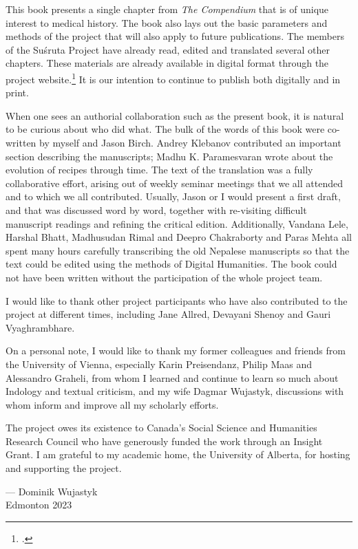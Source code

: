 This book presents a single chapter from \emph{The Compendium} that is of
unique interest to medical history.  The book also lays out the basic
parameters and methods of the project that will also apply to future
publications. The members of the Suśruta Project have already read, edited and
translated several other chapters.  These materials are already available in
digital format through the project website.\footcite{wuja-2021b} It is our
intention to continue to publish both digitally and in print.

When one sees an authorial collaboration such as the present book, it is natural to be 
curious about who did what.  The bulk of the words of this book were co-written by 
myself and Jason Birch.  Andrey Klebanov contributed an important section describing 
the manuscripts; Madhu K. Paramesvaran wrote about the evolution of recipes 
through time. The text of the translation was a fully collaborative effort, arising out of 
weekly seminar meetings that we all attended and to which we all contributed. 
Usually, Jason or I would present a first draft, and that was discussed word by word, 
together with re-visiting difficult manuscript readings and refining the critical edition. 
Additionally, Vandana Lele, Harshal Bhatt, Madhusudan Rimal and Deepro 
Chakraborty and Paras Mehta all spent many hours carefully transcribing the old 
Nepalese manuscripts so that the text could be edited using the methods of Digital 
Humanities.  The book could not have been written without the participation of the 
whole project team.


I would like to thank other project participants who have also contributed to
the project at different times, including Jane Allred, Devayani Shenoy and
Gauri Vyaghrambhare.  

On a personal note, I would like to thank my former colleagues and friends
from the University of Vienna, especially Karin Preisendanz, Philip Maas and
Alessandro Graheli, from whom I learned and continue to learn so much about
Indology and textual criticism, and my wife Dagmar Wujastyk, discussions with
whom inform and improve all my scholarly efforts.

The project owes its existence to Canada's Social Science and Humanities Research 
Council who have generously funded the work through an Insight Grant. I am grateful 
to my academic home, the University of Alberta, for hosting and supporting the 
project. 

{\flushright --- Dominik Wujastyk\\ Edmonton 2023\par}

